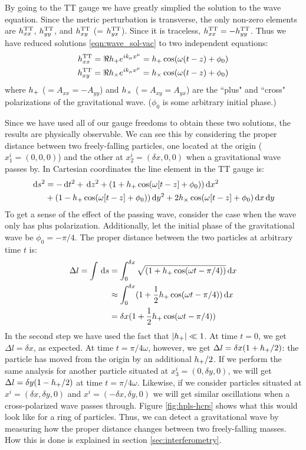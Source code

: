 By going to the TT gauge we have greatly simplied the solution to the wave equation. Since the metric perturbation is transverse, the only non-zero elements are $h^{\mathrm{TT}}_{xx}$, $h^{\mathrm{TT}}_{yy}$, and $h^{\mathrm{TT}}_{xy}$ (= $h^{\mathrm{TT}}_{yx}$). Since it is traceless, $h^{\mathrm{TT}}_{xx} = -h^{\mathrm{TT}}_{yy}$. Thus we have reduced solutions \ref{eqn:wave_sol-vac} to two independent equations:
\begin{align}
h^{\mathrm{TT}}_{xx} = \Re h_{+} e^{ik_\mu x^\mu} = h_{+} \cos(\omega(t-z) + \phi_0) \\
h^{\mathrm{TT}}_{xy} = \Re h_{\times} e^{ik_\mu x^\mu} = h_{\times} \cos(\omega(t-z) + \phi_0)
\end{align}
where $h_{+}$ ($= A_{xx} = -A_{yy}$) and $h_{\times}$ ($= A_{xy} = A_{yx}$) are the ``plus" and ``cross" polarizations of the gravitational wave. ($\phi_0$ is some arbitrary initial phase.)

Since we have used all of our gauge freedoms to obtain these two solutions, the results are physically observable. We can see this by considering the proper distance between two freely-falling particles, one located at the origin ($x_1^i = (0,0,0)$) and the other at $x_2^i = (\delta x,0,0)$ when a gravitational wave passes by. In Cartesian coordinates the line element in the TT gauge is:
\begin{align*}
\,\mathrm{d} s^2 &= -\,\mathrm{d} t^2 + \,\mathrm{d} z^2 + (1+ h_{+} \cos(\omega[t-z]+\phi_0)) \,\mathrm{d} x^2 \\
     &+ (1 - h_{+} \cos(\omega[t-z]+\phi_0)) \,\mathrm{d} y^2 + 2 h_{\times} \cos(\omega[t-z]+\phi_0) \,\mathrm{d} x \,\mathrm{d} y
\end{align*}
To get a sense of the effect of the passing wave, consider the case when the wave only has plus polarization. Additionally, let the initial phase of the gravitational wave be $\phi_0 = -\pi/4$. The proper distance between the two particles at arbitrary time $t$ is: 
\begin{align}
\Delta l = \int \,\mathrm{d} s &= \int_0^{\delta x} \sqrt{(1 + h_{+} \cos(\omega t - \pi/4))} \,\mathrm{d} x \\
    &\approx \int_0^{\delta x} (1 + \frac{1}{2} h_{+} \cos(\omega t - \pi/4)) \,\mathrm{d} x \\
    &= \delta x (1 + \frac{1}{2} h_{+} \cos(\omega t - \pi/4))
\end{align}
In the second step we have used the fact that $|h_{+}| \ll 1$. At time $t=0$, we get $\Delta l = \delta x$, as expected. At time $t= \pi/4\omega$, however, we get $\Delta l = \delta x(1 + h_{+}/2)$: the particle has moved from the origin by an additional $h_{+}/2$. If we perform the same analysis for another particle situated at $x_3^i = (0,\delta y, 0)$, we will get $\Delta l = \delta y(1 - h_{+}/2)$ at time $t = \pi/4\omega$. Likewise, if we consider particles situated at $x^i = (\delta x, \delta y, 0)$ and $x^i = (-\delta x, \delta y, 0)$ we will get similar oscillations when a cross-polarized wave passes through. Figure \ref{fig:hpls-hcrs} shows what this would look like for a ring of particles. Thus, we can detect a gravitational wave by measuring how the proper distance changes between two freely-falling masses. How this is done is explained in section \ref{sec:interferometry}.

